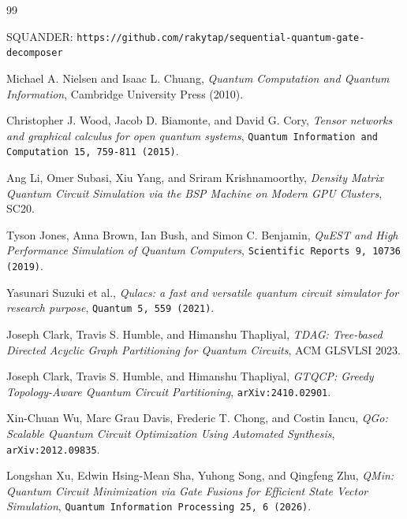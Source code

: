\begin{thebibliography}{99}

  SQUANDER: \texttt{https://github.com/rakytap/sequential-quantum-gate-decomposer}

  Michael A. Nielsen and Isaac L. Chuang, \textit{Quantum Computation and Quantum
    Information}, Cambridge University Press (2010).

  Christopher J. Wood, Jacob D. Biamonte, and David G. Cory, \textit{Tensor networks
    and graphical calculus for open quantum systems}, \texttt{Quantum Information and
    Computation 15, 759-811 (2015)}.

  Ang Li, Omer Subasi, Xiu Yang, and Sriram Krishnamoorthy, \textit{Density Matrix
    Quantum Circuit Simulation via the BSP Machine on Modern GPU Clusters}, SC20.

  Tyson Jones, Anna Brown, Ian Bush, and Simon C. Benjamin, \textit{QuEST and High
    Performance Simulation of Quantum Computers}, \texttt{Scientific Reports 9, 10736
    (2019)}.

  Yasunari Suzuki et al., \textit{Qulacs: a fast and versatile quantum circuit
    simulator for research purpose}, \texttt{Quantum 5, 559 (2021)}.

  Joseph Clark, Travis S. Humble, and Himanshu Thapliyal, \textit{TDAG: Tree-based
    Directed Acyclic Graph Partitioning for Quantum Circuits}, ACM GLSVLSI 2023.

  Joseph Clark, Travis S. Humble, and Himanshu Thapliyal, \textit{GTQCP: Greedy
    Topology-Aware Quantum Circuit Partitioning}, \texttt{arXiv:2410.02901}.

  Xin-Chuan Wu, Marc Grau Davis, Frederic T. Chong, and Costin Iancu, \textit{QGo:
    Scalable Quantum Circuit Optimization Using Automated Synthesis},
  \texttt{arXiv:2012.09835}.

  Longshan Xu, Edwin Hsing-Mean Sha, Yuhong Song, and Qingfeng Zhu, \textit{QMin:
    Quantum Circuit Minimization via Gate Fusions for Efficient State Vector
    Simulation}, \texttt{Quantum Information Processing 25, 6 (2026)}.

\end{thebibliography}

